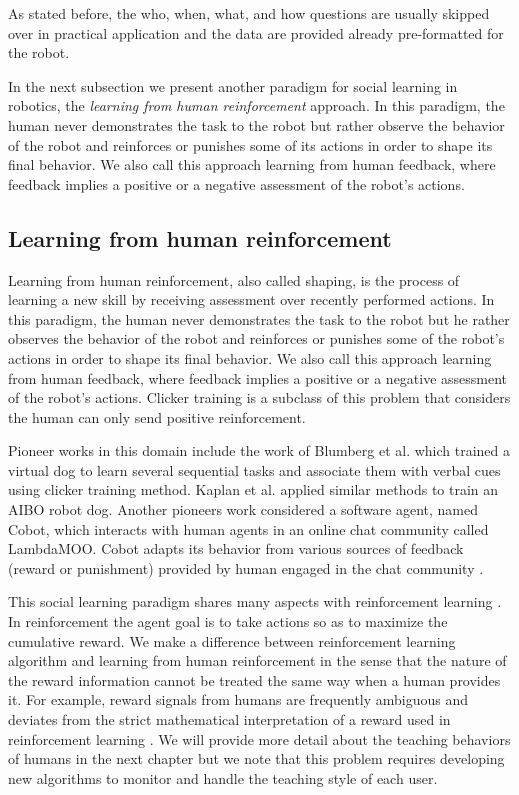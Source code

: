 \transition

As stated before, the who, when, what, and how questions are usually skipped over in practical application and the data are provided already pre-formatted for the robot.

In the next subsection we present another paradigm for social learning in robotics, the \emph{learning from human reinforcement} approach. In this paradigm, the human never demonstrates the task to the robot but rather observe the behavior of the robot and reinforces or punishes some of its actions in order to shape its final behavior. We also call this approach learning from human feedback, where feedback implies a positive or a negative assessment of the robot's actions.

\subsection{Learning from human reinforcement}

Learning from human reinforcement, also called shaping, is the process of learning a new skill by receiving assessment over recently performed actions. In this paradigm, the human never demonstrates the task to the robot but he rather observes the behavior of the robot and reinforces or punishes some of the robot's actions in order to shape its final behavior. We also call this approach learning from human feedback, where feedback implies a positive or a negative assessment of the robot's actions. Clicker training \cite{kaplan2002robotic} is a subclass of this problem that considers the human can only send positive reinforcement.

Pioneer works in this domain include the work of Blumberg et al. \cite{blumberg2002integrated} which trained a virtual dog to learn several sequential tasks and associate them with verbal cues using clicker training method. Kaplan et al. \cite{kaplan2002robotic} applied similar methods to train an AIBO robot dog. Another pioneers work considered a software agent, named Cobot, which interacts with human agents in an online chat community called LambdaMOO. Cobot adapts its behavior from various sources of feedback (reward or punishment) provided by human engaged in the chat community \cite{isbell2001social}.

This social learning paradigm shares many aspects with reinforcement learning \cite{sutton1998reinforcement}. In reinforcement the agent goal is to take actions so as to maximize the cumulative reward. We make a difference between reinforcement learning algorithm and learning from human reinforcement in the sense that the nature of the reward information cannot be treated the same way when a human provides it. For example, reward signals from humans are frequently ambiguous and deviates from the strict mathematical interpretation of a reward used in reinforcement learning \cite{thomaz2008teachable,Cakmak2010optimality}. We will provide more detail about the teaching behaviors of humans in the next chapter but we note that this problem requires developing new algorithms to monitor and handle the teaching style of each user.

